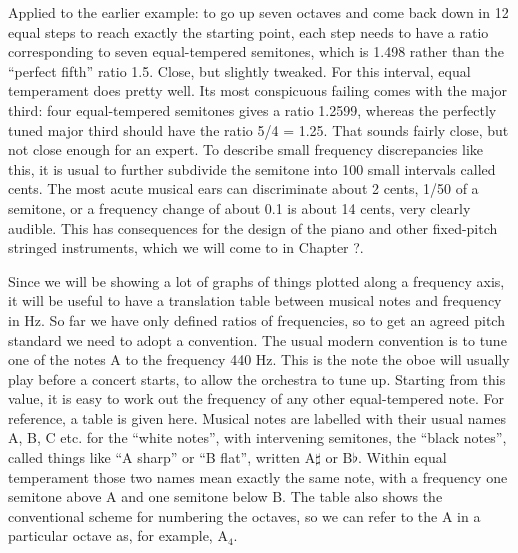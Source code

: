   Applied to the earlier example: to go up seven octaves and come back down in 
  12 equal steps to reach exactly the starting point, each step needs to have a 
  ratio corresponding to seven equal-tempered semitones, which is 1.498 rather 
  than the ``perfect fifth'' ratio 1.5. Close, but slightly tweaked. For this 
  interval, equal temperament does pretty well. Its most conspicuous failing 
  comes with the major third: four equal-tempered semitones gives a ratio 
  1.2599, whereas the perfectly tuned major third should have the ratio 5/4 = 
  1.25. That sounds fairly close, but not close enough for an expert. To 
  describe small frequency discrepancies like this, it is usual to further 
  subdivide the semitone into 100 small intervals called cents. The most acute 
  musical ears can discriminate about 2 cents, 1/50 of a semitone, or a 
  frequency change of about 0.1%
  is about 14 cents, very clearly audible. This has consequences for the design 
  of the piano and other fixed-pitch stringed instruments, which we will come 
  to in Chapter ?. 

  Since we will be showing a lot of graphs of things plotted along a frequency 
  axis, it will be useful to have a translation table between musical notes and 
  frequency in Hz. So far we have only defined ratios of frequencies, so to get 
  an agreed pitch standard we need to adopt a convention. The usual modern 
  convention is to tune one of the notes A to the frequency 440 Hz. This is the 
  note the oboe will usually play before a concert starts, to allow the 
  orchestra to tune up. Starting from this value, it is easy to work out the 
  frequency of any other equal-tempered note. For reference, a table is given 
  here. Musical notes are labelled with their usual names A, B, C etc. for the 
  ``white notes'', with intervening semitones, the ``black notes'', called 
  things like ``A sharp'' or ``B flat'', written A$\sharp$ or B$\flat$. Within 
  equal temperament those two names mean exactly the same note, with a 
  frequency one semitone above A and one semitone below B. The table also shows 
  the conventional scheme for numbering the octaves, so we can refer to the A 
  in a particular octave as, for example, A$_4$. 

